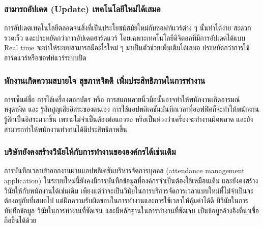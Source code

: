 \subsubsection{สามารถอัปเดต (Update) เทคโนโลยีใหม่ได้เสมอ}
\quad การอัปเดตเทคโนโลยีตลอดจนสิ่งที่เป็นประโยชน์สมัยใหม่กับซอฟท์แวร์ต่าง ๆ นั้นทำได้ง่าย สะดวก รวดเร็ว และประหยัดกว่าการอัปเดตฮาร์ดแวร์ 
โดยเฉพาะเทคโนโลยีดิจิตอลที่มีการอัปเดตได้แบบ Real time จะทำให้ระบบสามารถมีอะไรใหม่ ๆ มาเป็นตัวช่วยเพิ่มเติมได้เสมอ 
ประหยัดกว่าการใช้ฮาร์ดแวร์หรือซอฟท์แวร์ระบบปิด 
\subsubsection{พักงานเกิดความสบายใจ สุขภาพจิตดี เพิ่มประสิทธิภาพในการทำงาน}
\quad การเซ็นต์ชื่อ การใช้เครื่องตอกบัตร หรือ การสแกนลายนิ้วมือนั้นอาจทำให้พนักงานเกิดอารมณ์หงุดหงิด และ รู้สึกสูญเสียอิสระของตนเอง 
การใช้แอปพลิเคชันบันทึกเวลาที่ออฟฟิศก็จะทำให้พนักงานรู้สึกเป็นอิสระมากขึ้น เพราะไม่จำเป็นต้องต่อแถวรอ หรือเป็นห่วงว่าเครื่องจะทำงานผิดพลาด
และยังสามารถทำให้พนักงานทำงานได้มีประสิทธิภาพขึ้น 
\subsubsection{บริษัทยังคงสร้างวินัยให้กับการทำงานขององค์กรได้เช่นเดิม}  
\quad การบันทึกเวลาเข้าออกงานผ่านแอปพลิเคชันบริหารจัดการบุคคล (attendance management application) 
ในระบบใหม่นี้ยังคงมีการบันทึกข้อมูลที่องค์กรจำเป็นต้องใช้เหมือนเดิม และยังคงสร้างวินัยให้กับพนักงานได้เช่นเดิม 
เพียงแต่ว่าจะเป็นวินัยในการบริการจัดการเวลาแบบใหม่ที่ไม่จำเป็นจะต้องอยู่กับที่เสมอไป แต่ฝึกความรับผิดชอบในการทำงานและการใช้เวลาให้คุ้มค่าได้ดี 
มีวินัยในการบันทึกข้อมูล วินัยในการทำงานที่ชัดเจน และมีหลักฐานในการทำงานที่ชัดเจน เป็นข้อมูลอ้างอิงที่น่าเชื่อถือขึ้นได้ด้วย 
\cite{hrnote}
